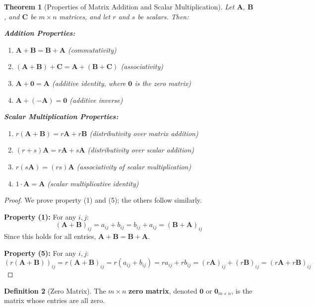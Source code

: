 \documentclass[12pt]{article}
\numberwithin{equation}{section}
\newcommand{\mat}[1]{\mathbf{#1}}        %
\theoremstyle{plain}
\newtheorem{theorem}{Theorem}[section]
\theoremstyle{definition}
\newtheorem{definition}[theorem]{Definition}
\theoremstyle{remark}
\begin{document}
\begin{theorem}[Properties of Matrix Addition and Scalar Multiplication]
Let $\mat{A}$, $\mat{B}$, and $\mat{C}$ be $m \times n$ matrices, and let $r$ and $s$ be scalars. Then:

\textbf{Addition Properties:}
\begin{enumerate}
\item $\mat{A} + \mat{B} = \mat{B} + \mat{A}$ (commutativity)
\item $(\mat{A} + \mat{B}) + \mat{C} = \mat{A} + (\mat{B} + \mat{C})$ (associativity)
\item $\mat{A} + \mat{0} = \mat{A}$ (additive identity, where $\mat{0}$ is the zero matrix)
\item $\mat{A} + (-\mat{A}) = \mat{0}$ (additive inverse)
\end{enumerate}

\textbf{Scalar Multiplication Properties:}
\begin{enumerate}[resume]
\item $r(\mat{A} + \mat{B}) = r\mat{A} + r\mat{B}$ (distributivity over matrix addition)
\item $(r + s)\mat{A} = r\mat{A} + s\mat{A}$ (distributivity over scalar addition)
\item $r(s\mat{A}) = (rs)\mat{A}$ (associativity of scalar multiplication)
\item $1 \cdot \mat{A} = \mat{A}$ (scalar multiplicative identity)
\end{enumerate}
\end{theorem}

\begin{proof}
We prove property (1) and (5); the others follow similarly.

\textbf{Property (1):} For any $i,j$:
$$(\mat{A} + \mat{B})_{ij} = a_{ij} + b_{ij} = b_{ij} + a_{ij} = (\mat{B} + \mat{A})_{ij}$$
Since this holds for all entries, $\mat{A} + \mat{B} = \mat{B} + \mat{A}$.

\textbf{Property (5):} For any $i,j$:
$$(r(\mat{A} + \mat{B}))_{ij} = r(\mat{A} + \mat{B})_{ij} = r(a_{ij} + b_{ij}) = ra_{ij} + rb_{ij} = (r\mat{A})_{ij} + (r\mat{B})_{ij} = (r\mat{A} + r\mat{B})_{ij}$$
\end{proof}

\begin{definition}[Zero Matrix]
The $m \times n$ \textbf{zero matrix}, denoted $\mat{0}$ or $\mat{0}_{m \times n}$, is the matrix whose entries are all zero.
\end{definition}
\end{document}
